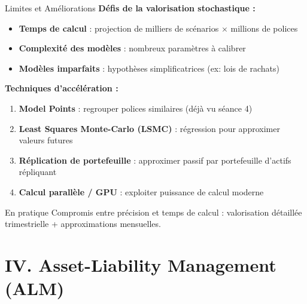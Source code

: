 \documentclass[10pt,aspectratio=169]{beamer}
\begin{document}
\begin{frame}{Limites et Améliorations}
\textbf{Défis de la valorisation stochastique :}

\begin{itemize}
    \item[\texttimes] \textbf{Temps de calcul} : projection de milliers de scénarios $\times$ millions de polices
    \item[\texttimes] \textbf{Complexité des modèles} : nombreux paramètres à calibrer
    \item[\texttimes] \textbf{Modèles imparfaits} : hypothèses simplificatrices (ex: lois de rachats)
\end{itemize}

\vspace{0.3cm}
\textbf{Techniques d'accélération :}

\begin{enumerate}
    \item \textbf{Model Points} : regrouper polices similaires (déjà vu séance 4)
    \item \textbf{Least Squares Monte-Carlo (LSMC)} : régression pour approximer valeurs futures
    \item \textbf{Réplication de portefeuille} : approximer passif par portefeuille d'actifs répliquant
    \item \textbf{Calcul parallèle / GPU} : exploiter puissance de calcul moderne
\end{enumerate}

\vspace{0.3cm}
\begin{exampleblock}{En pratique}
Compromis entre précision et temps de calcul : valorisation détaillée trimestrielle + approximations mensuelles.
\end{exampleblock}
\end{frame}

\section{IV. Asset-Liability Management (ALM)}
\end{document}
